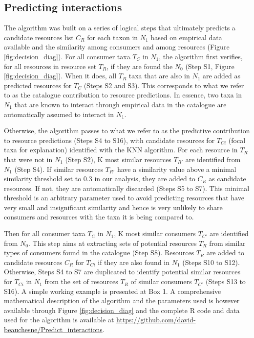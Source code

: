   \subsection{Predicting interactions}
The algorithm was built on a series of logical steps that ultimately predicts a candidate resources list $C_R$ for each taxon in $N_1$ based on empirical data available and the similarity among consumers and among resources (Figure \ref{fig:decision_diag}). For all consumer taxa $T_C$ in $N_1$, the algorithm first verifies, for all resources in resource set $T_R$, if they are found the $N_0$ (Step S1, Figure \ref{fig:decision_diag}). When it does, all $T_R$ taxa that are also in $N_1$ are added as predicted resources for $T_C$ (Steps S2 and S3). This corresponds to what we refer to as the catalogue contribution to resource predictions. In essence, two taxa in $N_1$ that are known to interact through empirical data in the catalogue are automatically assumed to interact in $N_1$.

Otherwise, the algorithm passes to what we refer to as the predictive contribution to resource predictions (Steps S4 to S16), with candidate resources for $T_{Ci}$ (focal taxa for explanation) identified with the KNN algorithm. For each resource in $T_R$ that were not in $N_1$ (Step S2), K most similar resources $T_{R'}$ are identified from $N_1$ (Step S4). If similar resources $T_{R'}$ have a similarity value above a minimal similarity threshold set to 0.3 in our analysis, they are added to $C_R$ as candidate resources. If not, they are automatically discarded (Steps S5 to S7). This minimal threshold is an arbitrary parameter used to avoid predicting resources that have very small and insignificant similarity and hence is very unlikely to share consumers and resources with the taxa it is being compared to.

Then for all consumer taxa $T_C$ in $N_1$, K most similar consumers $T_{C'}$ are identified from $N_0$. This step aims at extracting sets of potential resources $T_R$ from similar types of consumers found in the catalogue (Step S8). Resources $T_R$ are added to candidate resources $C_R$ for $T_{Ci}$ if they are also found in $N_1$ (Steps S10 to S12). Otherwise, Steps S4 to S7 are duplicated to identify potential similar resources for $T_{Ci}$ in $N_1$ from the set of resources $T_R$ of similar consumers $T_{C'}$ (Steps S13 to S16). A simple working example is presented at Box 1. A comprehensive mathematical description of the algorithm and the parameters used is however available through Figure \ref{fig:decision_diag} and the complete R code and data used for the algorithm is available at \href{https://github.com/david-beauchesne/Predict_interactions}{https://github.com/david-beauchesne/Predict\_interactions}.

